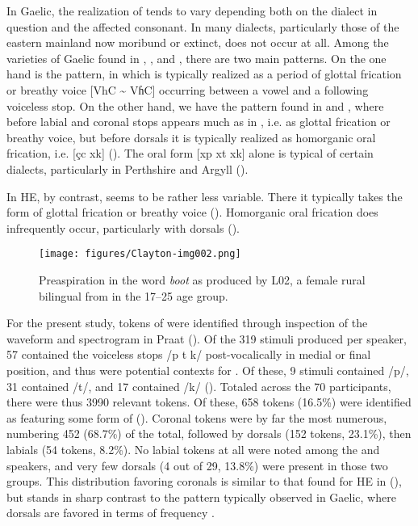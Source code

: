 \documentclass[output=paper,colorlinks,citecolor=brown]{langscibook}
\begin{document}
In Gaelic, the realization of  tends to vary depending both on the dialect in question and the affected consonant. In many dialects, particularly those of the eastern mainland now moribund or extinct,  does not occur at all. Among the varieties of Gaelic found in , , and , there are two main  patterns. On the one hand is the  pattern, in which  is typically realized as a period of glottal frication or breathy voice [VhC {\textasciitilde} VɦC] occurring between a vowel and a following voiceless stop. On the other hand, we have the pattern found in  and , where before labial and coronal stops  appears much as in , i.e. as glottal frication or breathy voice, but before dorsals it is typically realized as homorganic oral frication, i.e. [çc xk] (\citealt{Nance:2013, Clayton:2010, Ladefoged:1998, O-Dochartaigh:1994, Ni-Chasaide:1985, Borgstrom:1940}). The oral form [xp xt xk] alone is typical of certain dialects, particularly in Perthshire and Argyll (\citealt{Iosad:2015, O-Murchu:1989}). 

In HE, by contrast,  seems to be rather less variable. There it typically takes the form of glottal frication or breathy voice (). Homorganic oral frication does infrequently occur, particularly with dorsals (\citealt{Clayton:2018, Clayton:2017, Clayton:2015, Shuken:1985}).

\begin{figure}
\texttt{[image: figures/Clayton-img002.png]}
\caption{Preaspiration in the word \textit{boot} as produced by L02, a female rural bilingual from  in the 17--25 age group.}
\label{fig:2}
\end{figure}

For the present study, tokens of  were identified through inspection of the waveform and spectrogram in Praat (\cite{Boersma:2020}). Of the 319 stimuli produced per speaker, 57 contained the voiceless stops /p t k/ post-vocalically in medial or final position, and thus were potential contexts for . Of these, 9 stimuli contained /p/, 31 contained /t/, and 17 contained /k/ (). Totaled across the 70 participants, there were thus 3990 relevant tokens. Of these, 658 tokens (16.5\%) were identified as featuring some form of  (). Coronal tokens were by far the most numerous, numbering 452 (68.7\%) of the total, followed by dorsals (152 tokens, 23.1\%), then labials (54 tokens, 8.2\%). No labial tokens at all were noted among the  and  speakers, and very few dorsals (4 out of 29, 13.8\%) were present in those two groups. This distribution favoring coronals is similar to that found for HE in \citeauthor{Clayton:2017} (\citeyear{Clayton:2017, Clayton:2018}), but stands in sharp contrast to the pattern typically observed in Gaelic, where dorsals are favored in terms of frequency \citep{Clayton:2010}. 
\end{document}
